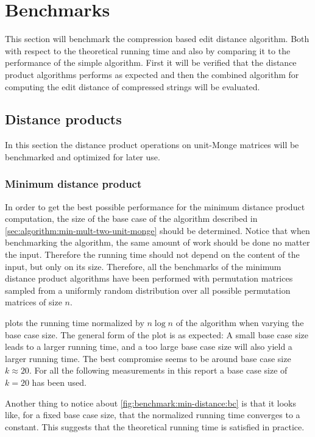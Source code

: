 \documentclass[twoside,11pt,openright]{report}
\begin{document}
\clearpage
\section{Benchmarks}
\label{sec:algorithm:benchmarks}
This section will benchmark the compression based edit distance algorithm. Both with respect to the theoretical running time and also by comparing it to the performance of the simple algorithm. First it will be verified that the distance product algorithms performs as expected and then the combined algorithm for computing the edit distance of compressed strings will be evaluated.

\subsection{Distance products}
In this section the distance product operations on unit-Monge matrices will be benchmarked and optimized for later use.

\subsubsection{Minimum distance product}
\label{sec:min-dist-mult-bc}
In order to get the best possible performance for the minimum distance product computation, the size of the base case of the algorithm described in \cref{sec:algorithm:min-mult-two-unit-monge} should be determined. Notice that when benchmarking the algorithm, the same amount of work should be done no matter the input. Therefore the running time should not depend on the content of the input, but only on its size. Therefore, all the benchmarks of the minimum distance product algorithms have been performed with permutation matrices sampled from a uniformly random distribution over all possible permutation matrices of size $n$.

 plots the running time normalized by $n\log{n}$ of the algorithm when varying the base case size. The general form of the plot is as expected: A small base case size leads to a larger running time, and a too large base case size will also yield a larger running time. The best compromise seems to be around base case size $k \approx 20$. For all the following measurements in this report a base case size of $k = 20$ has been used.

Another thing to notice about \cref{fig:benchmark:min-distance:bc} is that it looks like, for a fixed base case size, that the normalized running time converges to a constant. This suggests that the theoretical running time is satisfied in practice.
\end{document}
